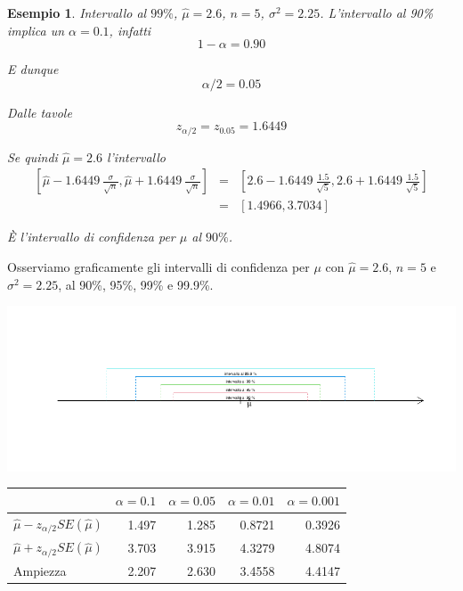 \documentclass[
  11pt,
]{book}
\theoremstyle{mytheoremstyle}
\theoremstyle{mydefstyle}
\newtheorem{example}{{Esempio}}[section]
\begin{document}
\begin{example}
Intervallo al \(99\%\), \(\hat \mu=2.6\), \(n=5\), \(\sigma^2=2.25\). L'intervallo al 90\% implica un \(\alpha=0.1\), infatti
\[1-\alpha=0.90\]

E dunque
\[\alpha/2=0.05\]

Dalle tavole
\[z_{\alpha/2}=z_{0.05}=1.6449\]

Se quindi \(\hat \mu = 2.6\) l'intervallo
\begin{eqnarray*}
 \left[\hat \mu- 1.6449~\frac\sigma{\sqrt n},\hat \mu+ 1.6449~\frac\sigma{\sqrt n}\right] &=&
\left[2.6- 1.6449~\frac{1.5}{\sqrt 5},2.6+ 1.6449~\frac{1.5}{\sqrt 5}\right]\\
 &=& \left[1.4966,3.7034\right]
\end{eqnarray*}

È l'intervallo di confidenza per \(\mu\) al \(90\%\).
\end{example}

Osserviamo graficamente gli intervalli di confidenza per \(\mu\) con \(\hat \mu=2.6\), \(n=5\) e \(\sigma^2=2.25\), al 90\%, 95\%, 99\% e 99.9\%.

\begin{center}\includegraphics{Appunti_di_Statistica_2025_files/figure-latex/13-stima-intervallare-1,-1} \end{center}

\begin{tabular}{lrrrr}
\toprule
  & $\alpha=0.1$ & $\alpha=0.05$ & $\alpha=0.01$ & $\alpha=0.001$\\
\midrule
$\hat \mu - z_{\alpha/2}SE(\hat \mu)$ & 1.497 & 1.285 & 0.8721 & 0.3926\\
$\hat \mu + z_{\alpha/2}SE(\hat \mu)$ & 3.703 & 3.915 & 4.3279 & 4.8074\\
Ampiezza & 2.207 & 2.630 & 3.4558 & 4.4147\\
\bottomrule
\end{tabular}
\end{document}

